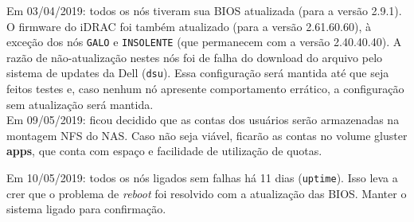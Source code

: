 Em 03/04/2019: todos os nós tiveram sua BIOS atualizada (para a versão 2.9.1). O firmware do iDRAC foi também atualizado (para a versão 2.61.60.60), à exceção dos nós \texttt{GALO} e \texttt{INSOLENTE} (que permanecem com a versão 2.40.40.40). A razão de não-atualização nestes nós foi de falha do download do arquivo pelo sistema de updates da Dell (\texttt{dsu}). Essa configuração será mantida 
até que seja feitos testes e, caso nenhum nó apresente comportamento errático, 
a configuração sem atualização será mantida.\\


Em 09/05/2019: ficou decidido que as contas dos usuários serão armazenadas na 
montagem NFS do NAS. Caso não seja viável, ficarão as contas no volume gluster 
\textbf{apps}, que conta com espaço e facilidade de utilização de quotas.

Em 10/05/2019: todos os nós ligados sem falhas há 11 dias (\texttt{uptime}).
Isso leva a crer que o problema de \textit{reboot} foi resolvido com a
atualização das BIOS. Manter o sistema ligado para confirmação.


